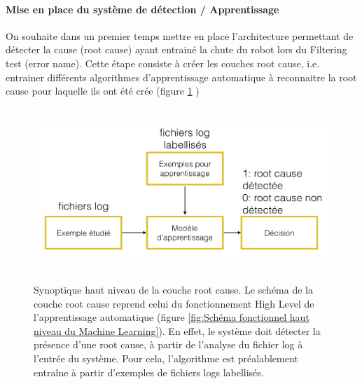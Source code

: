 \paragraph{Mise en place du système de détection / Apprentissage}
On souhaite dans un premier temps mettre en place l'architecture permettant de détecter la cause (root cause) ayant entrainé la chute du robot lors du Filtering test (error name). Cette étape consiste à créer les couches root cause, i.e. entrainer différents algorithmes d'apprentissage automatique à reconnaitre la root cause pour laquelle ils ont été crée (figure \ref{fig:synoptique haut niveau de la solution proposée: couche root cause} )

\begin{figure}[h]
	\centering\includegraphics[height=6.5cm]{images/synoptique_root.png}
	\caption[Synoptique haut niveau de la couche root cause]{Synoptique haut niveau de la couche root cause. Le schéma de la couche root cause reprend celui du fonctionnement High Level de l'apprentissage automatique (figure \ref{fig:Schéma fonctionnel haut niveau du Machine Learning}). En effet, le système doit détecter la présence d'une root cause, à partir de l'analyse du fichier log à l'entrée du système. Pour cela, l'algorithme est préalablement entraîne à partir d'exemples de fichiers logs labellisés.}
	\label{fig:synoptique haut niveau de la solution proposée: couche root cause}
\end{figure}

